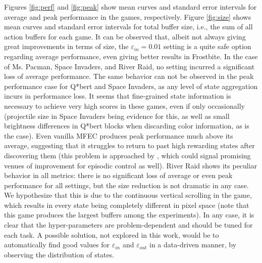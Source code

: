 \documentclass{article}
\begin{document}
Figures \ref{fig:perf} and \ref{fig:peak} show mean curves and standard error intervals for average and peak performance in the games, respectively. Figure \ref{fig:size} shows mean curves and standard error intervals for total buffer size, i.e., the sum of all action buffers for each game. It can be observed that, albeit not always giving great improvements in terms of size, the $\varepsilon_{in} = 0.01$ setting is a quite safe option regarding average performance, even giving better results in Frostbite. In the case of Ms. Pacman, Space Invaders, and River Raid, no setting incurred a significant loss of average performance. The same behavior can not be observed in the peak performance case for Q*bert and Space Invaders, as any level of state aggregation incurs in performance loss. It seems that fine-grained state information is necessary to achieve very high scores in these games, even if only occasionally (projectile size in Space Invaders being evidence for this, as well as small brightness differences in Q*bert blocks when discarding color information, as is the case). Even vanilla MFEC produces peak performance much above its average, suggesting that it struggles to return to past high rewarding states after discovering them (this problem is approached by \cite{ecoffet2020first}, which could signal promising venues of improvement for episodic control as well). River Raid shows its peculiar behavior in all metrics: there is no significant loss of average or even peak performance for all settings, but the size reduction is not dramatic in any case. We hypothesize that this is due to the continuous vertical scrolling in the game, which results in every state being completely different in pixel space (note that this game produces the largest buffers among the experiments). In any case, it is clear that the hyper-parameters are problem-dependent and should be tuned for each task. A possible solution, not explored in this work, would be to automatically find good values for $\varepsilon_{in}$ and $\varepsilon_{out}$ in a data-driven manner, by observing the distribution of states.
\end{document}
